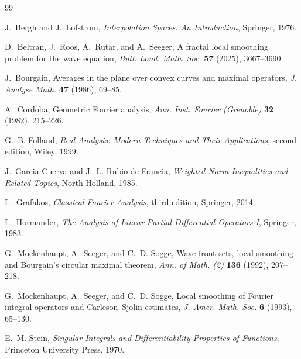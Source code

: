 \documentclass[11pt]{article}
\numberwithin{equation}{section}
\theoremstyle{definition}
\theoremstyle{remark}
\begin{document}
\begin{thebibliography}{99}

J.~Bergh and J.~Lofstrom,
\emph{Interpolation Spaces: An Introduction},
Springer, 1976.

D.~Beltran, J.~Roos, A.~Rutar, and A.~Seeger,
A fractal local smoothing problem for the wave equation,
\emph{Bull. Lond. Math. Soc.} \textbf{57} (2025), 3667--3690.

J.~Bourgain,
Averages in the plane over convex curves and maximal operators,
\emph{J. Analyse Math.} \textbf{47} (1986), 69--85.

A.~Cordoba,
Geometric Fourier analysis,
\emph{Ann. Inst. Fourier (Grenoble)} \textbf{32} (1982), 215--226.

G.~B. Folland,
\emph{Real Analysis: Modern Techniques and Their Applications}, second edition,
Wiley, 1999.

J.~Garcia-Cuerva and J.~L. Rubio de Francia,
\emph{Weighted Norm Inequalities and Related Topics},
North-Holland, 1985.

L.~Grafakos,
\emph{Classical Fourier Analysis}, third edition,
Springer, 2014.

L.~Hormander,
\emph{The Analysis of Linear Partial Differential Operators I},
Springer, 1983.

G.~Mockenhaupt, A.~Seeger, and C.~D. Sogge,
Wave front sets, local smoothing and Bourgain's circular maximal theorem,
\emph{Ann. of Math. (2)} \textbf{136} (1992), 207--218.

G.~Mockenhaupt, A.~Seeger, and C.~D. Sogge,
Local smoothing of Fourier integral operators and Carleson--Sjolin estimates,
\emph{J. Amer. Math. Soc.} \textbf{6} (1993), 65--130.

E.~M. Stein,
\emph{Singular Integrals and Differentiability Properties of Functions},
Princeton University Press, 1970.

\end{thebibliography}
\end{document}
